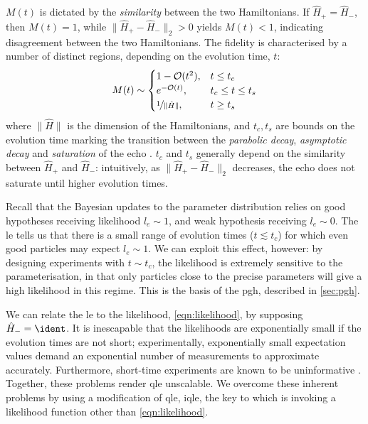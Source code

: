 $M(t)$ is dictated by the \emph{similarity} between the two Hamiltonians.
If $\hat{H}_{+} = \hat{H}_{-}$, then $M(t) = 1$, while $\|\hat{H}_{+} - \hat{H}_{-} \|_2 > 0$ yields $M(t) < 1$, 
    indicating disagreement between the two Hamiltonians. 
The fidelity is characterised by a number of distinct regions, depending on the evolution time, $t$:
\begin{align}
    \label{eqn:loschmidt_ranges}
    M(t) \sim 
    \begin{cases}
        1 - \mathcal{O}(t^2),  & t \leq t_c \\
        e^{-\mathcal{O}(t)}, & t_c \leq t \leq t_{s} \\
        \nicefrac{1}{\| \hat{H} \|}, & t \geq t_{s}
    \end{cases}
\end{align}
    where $\|\hat{H}\|$ is the dimension of the Hamiltonians, and $t_c, t_{s}$ are bounds on the evolution time marking the transition between the 
    \emph{parabolic decay}, \emph{asymptotic decay} and \emph{saturation} of the echo \cite{goussev2012loschmidt}. 
$t_c$ and $t_s$ generally depend on the similarity between $\hat{H}_+$ and $\hat{H}_{-}$: 
    intuitively, as $\|\hat{H}_+ - \hat{H}_{-}\|_2$ decreases, the echo does not saturate until higher evolution times. 
\par 

Recall that the Bayesian updates to the parameter distribution relies on good hypotheses receiving likelihood $l_e \sim 1$,
    and weak hypothesis receiving $l_e \sim 0$. 
The \gls{le} tells us that there is a small range of evolution times ($t \lesssim t_c$) for which even good \glspl{particle} may expect $l_e \sim 1$.
We can exploit this effect, however: 
    by designing experiments with $t \sim t_c$, the likelihood is extremely sensitive to the parameterisation, 
    in that only \glspl{particle} close to the precise parameters will give a high likelihood in this regime. 
This is the basis of the \acrlong{pgh}, described in \cref{sec:pgh}. 
\par 

We can relate the \gls{le} to the likelihood, \cref{eqn:likelihood}, by supposing $\hat{H}_{-} = \ident$. 
It is inescapable that the \glspl{likelihood} are exponentially small if the evolution times are not short;
    experimentally, exponentially small expectation values demand an exponential number of measurements to approximate accurately.
Furthermore, short-time experiments are known to be uninformative \cite{wiebe2014qhlpra, wiebe2015quantum}.
Together, these problems render \gls{qle} unscalable.
We overcome these inherent problems by using a modification of \gls{qle}, \gls{iqle},
    the key to which is invoking a \gls{likelihood} function other than \cref{eqn:likelihood}.
    
